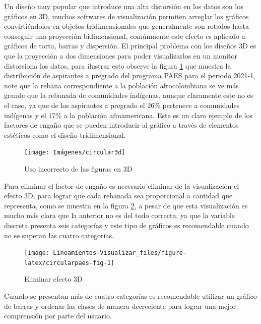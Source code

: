 \documentclass[
]{book}
\begin{document}
Un diseño muy popular que introduce una alta distorsión en los datos son los gráficos en 3D, muchos softwares de visualización permiten arreglar los gráficos convirtiéndolos en objetos tridimensionales que generalmente son rotados hasta conseguir una proyección bidimensional, comúnmente este efecto es aplicado a gráficos de torta, barras y dispersión. El principal problema con los diseños 3D es que la proyección a dos dimensiones para poder visualizarlos en un monitor distorsiona los datos, para ilustrar esto observe la figura \ref{fig:circular3d-fig} que muestra la distribución de aspirantes a pregrado del programa PAES para el periodo 2021-1, note que la rebana correspondiente a la población afrocolombiana se ve más grande que la rebanada de comunidades indígenas, aunque claramente este no es el caso, ya que de los aspirantes a pregrado el \(26\%\) pertenece a comunidades indígenas y el \(17\%\) a la población afroamericana. Este es un claro ejemplo de los factores de engaño que se pueden introducir al gráfico a través de elementos estéticos como el diseño tridimensional.

\begin{figure}

{\centering \texttt{[image: Imágenes/circular3d]} 

}

\caption{Uso incorrecto de las figuras en 3D}\label{fig:circular3d-fig}
\end{figure}

Para eliminar el factor de engaño es necesario eliminar de la visualización el efecto 3D, para lograr que cada rebanada sea proporcional a cantidad que representa, como se muestra en la figura \ref{fig:circularpaes-fig}, a pesar de que esta visualización es mucho más clara que la anterior no es del todo correcta, ya que la variable discreta presenta seis categorías y este tipo de gráficos es recomendable cuando no se superan las cuatro categorías.

\begin{figure}

{\centering \texttt{[image: Lineamientos-Visualizar\_files/figure-latex/circularpaes-fig-1]} 

}

\caption{Eliminar efecto 3D}\label{fig:circularpaes-fig}
\end{figure}

Cuando se presentan más de cuatro categorías es recomendable utilizar un gráfico de barras y ordenar las clases de manera decreciente para lograr una mejor comprensión por parte del usuario.
\end{document}
